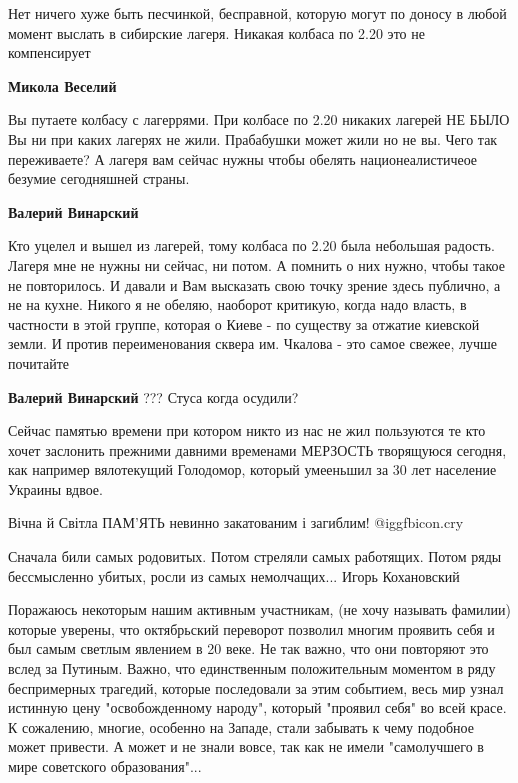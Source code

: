 \begin{itemize}

Нет ничего хуже быть песчинкой, бесправной, которую могут по доносу в любой
момент выслать в сибирские лагеря. Никакая колбаса по 2.20 это не компенсирует

\begin{itemize} %
\textbf{Микола Веселий} 

Вы путаете колбасу с лагеррями. При колбасе по 2.20 никаких лагерей НЕ БЫЛО Вы
ни при каких лагерях не жили. Прабабушки может жили но не вы. Чего так
переживаете? А лагеря вам сейчас нужны чтобы обелять национеалистичеое безумие
сегодняшней страны.

\begin{itemize} %
\textbf{Валерий Винарский} 

Кто уцелел и вышел из лагерей, тому колбаса по 2.20 была небольшая радость.
Лагеря мне не нужны ни сейчас, ни потом. А помнить о них нужно, чтобы такое не
повторилось. И давали и Вам высказать свою точку зрение здесь публично, а не на
кухне. Никого я не обеляю, наоборот критикую, когда надо власть, в частности в
этой группе, которая о Киеве - по существу за отжатие киевской земли. И против
переименования сквера им. Чкалова - это самое свежее, лучше почитайте

\textbf{Валерий Винарский} ??? Стуса когда осудили?


Сейчас памятью времени при котором никто из нас не жил пользуются те кто хочет
заслонить прежними давними временами МЕРЗОСТЬ творящуюся сегодня, как например
вялотекущий Голодомор, который умееньшил за 30 лет население Украины вдвое.

\end{itemize} %

\end{itemize} %

Вічна й Світла ПАМ'ЯТЬ невинно закатованим і загиблим! @igg{fbicon.cry} 

Сначала били самых родовитых.
Потом стреляли самых работящих.
Потом ряды бессмысленно убитых, росли из самых немолчащих...
Игорь Кохановский


Поражаюсь некоторым нашим активным участникам, (не хочу называть фамилии)
которые уверены, что октябрьский переворот позволил многим проявить себя и был
самым светлым явлением в 20 веке. Не так важно, что они повторяют это вслед за
Путиным. Важно, что единственным положительным моментом в ряду беспримерных
трагедий, которые последовали за этим событием, весь мир узнал истинную цену
"освобожденному народу", который "проявил себя" во всей красе. К сожалению,
многие, особенно на Западе, стали забывать к чему подобное может привести. А
может и не знали вовсе, так как не имели "самолучшего в мире советского
образования"...


\end{itemize}
